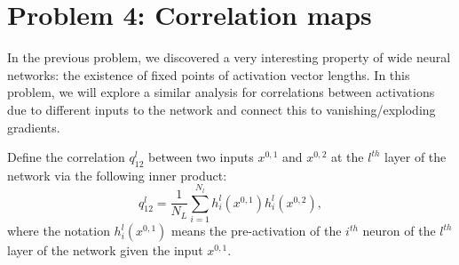 \documentclass[a4paper]{article}
\begin{document}
\section*{Problem 4: Correlation maps}

In the previous problem, we discovered a very interesting property of wide neural networks: the existence of fixed points of activation vector lengths.  In this problem, we will explore a similar analysis for correlations between activations due to different inputs to the network and connect this to vanishing/exploding gradients.

Define the correlation $q_{12}^l$ between two inputs $x^{0,1}$ and $x^{0,2}$ at the $l^{th}$ layer of the network via the following inner product:
\begin{equation}
    q^l_{12} = \frac{1}{N_L} \sum_{i=1}^{N_l} h_i^l(x^{0,1}) h_i^l(x^{0,2}),
\end{equation}
where the notation $h_i^l(x^{0,1})$ means the pre-activation of the $i^{th}$ neuron of the $l^{th}$ layer of the network given the input $x^{0,1}$.  
\end{document}
